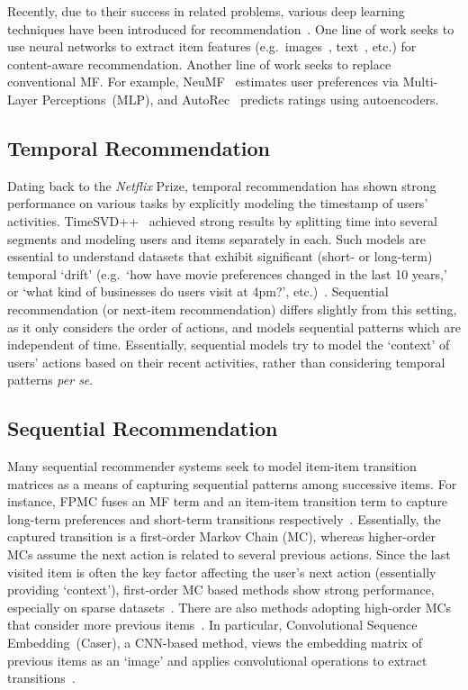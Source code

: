 \documentclass[conference]{IEEEtran}
\begin{document}
Recently, 
due to their success in related problems,
various deep learning techniques have been introduced for recommendation~\cite{DBLP:journals/corr/ZhangYS17aa}. One line of work seeks to use neural networks to extract item features (e.g.~images~\cite{wang2017your,DBLP:conf/icdm/KangFWM17}, text~\cite{DBLP:conf/kdd/WangWY15,DBLP:conf/recsys/KimPOLY16}, etc.) for content-aware recommendation. Another line of work seeks to replace conventional MF.
For example,
NeuMF~\cite{NeuMF} estimates user preferences via Multi-Layer Perceptions~(MLP), and AutoRec~\cite{sedhain2015autorec} predicts ratings using autoencoders.



\subsection{Temporal Recommendation}	

Dating back to the \emph{Netflix} Prize, temporal recommendation has shown strong performance on various tasks by explicitly modeling the timestamp of users' activities.
TimeSVD++~\cite{timeSVD} achieved 
strong
results by 
splitting
time into several segments and modeling users and items 
separately in each.
Such models are essential
to understand 
datasets that exhibit significant (short- or long-term) temporal `drift'
(e.g.~`how have movie preferences changed in the last 10 years,' or
`what 
kind of businesses do users visit at 4pm?', etc.)~\cite{DBLP:conf/wsdm/WuABSJ17,xiong2010temporal,timeSVD}. Sequential recommendation (or next-item recommendation) differs 
slightly from this setting,
as it only considers the order of actions, and models sequential patterns which are independent of time.
Essentially, sequential models try to model the `context' of users' actions based on their recent activities, rather than considering temporal patterns
\emph{per se}.

\subsection{Sequential Recommendation}

Many sequential recommender systems seek to model 
item-item transition matrices
as a means of capturing sequential patterns among
successive items. 
For instance,
FPMC fuses an MF term and an item-item transition term to capture long-term preferences and short-term transitions respectively~\cite{rendle2010fpmc}. Essentially, the captured transition is a first-order Markov Chain (MC), whereas 
higher-order MCs
assume the next 
action is
related to 
several previous actions.
Since the last visited item is often the key factor affecting the user's next action (essentially providing `context'), first-order MC based methods show strong performance, especially on sparse datasets~\cite{DBLP:conf/recsys/HeKM17}.
There are also methods adopting high-order MCs that consider more previous items~\cite{DBLP:conf/recsys/HeFWM16,DBLP:conf/icdm/HeM16}. In particular, Convolutional Sequence Embedding~(Caser), a 
CNN-based method, views the embedding matrix of  previous items as an `image' and applies convolutional operations to extract transitions~\cite{DBLP:conf/wsdm/TangW18}.
\end{document}
